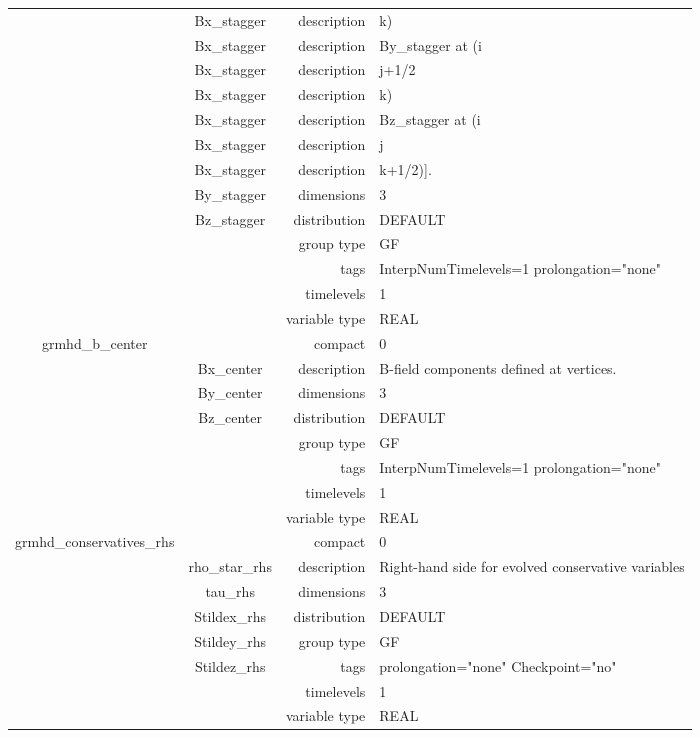 \begin{tabular*}{150mm}{|c|c@{\extracolsep{\fill}}|rl|}
 & Bx\_stagger & description & k) \\ 
 & Bx\_stagger & description & By\_stagger at (i \\ 
 & Bx\_stagger & description & j+1/2 \\ 
 & Bx\_stagger & description & k) \\ 
 & Bx\_stagger & description & Bz\_stagger at (i \\ 
 & Bx\_stagger & description & j \\ 
 & Bx\_stagger & description & k+1/2)]. \\ 
 & By\_stagger & dimensions & 3 \\ 
 & Bz\_stagger & distribution & DEFAULT \\ 
 &  & group type & GF \\ 
 &  & tags & InterpNumTimelevels=1 prolongation="none" \\ 
 &  & timelevels & 1 \\ 
 &  & variable type & REAL \\ 
\hline 
grmhd\_b\_center &  & compact & 0 \\ 
 & Bx\_center & description & B-field components defined at vertices. \\ 
 & By\_center & dimensions & 3 \\ 
 & Bz\_center & distribution & DEFAULT \\ 
 &  & group type & GF \\ 
 &  & tags & InterpNumTimelevels=1 prolongation="none" \\ 
 &  & timelevels & 1 \\ 
 &  & variable type & REAL \\ 
\hline 
grmhd\_conservatives\_rhs &  & compact & 0 \\ 
 & rho\_star\_rhs & description & Right-hand side for evolved conservative variables \\ 
 & tau\_rhs & dimensions & 3 \\ 
 & Stildex\_rhs & distribution & DEFAULT \\ 
 & Stildey\_rhs & group type & GF \\ 
 & Stildez\_rhs & tags & prolongation="none" Checkpoint="no" \\ 
 &  & timelevels & 1 \\ 
 &  & variable type & REAL \\ 
\hline 
\end{tabular*} 



\vspace{5mm}
\vspace{5mm}

